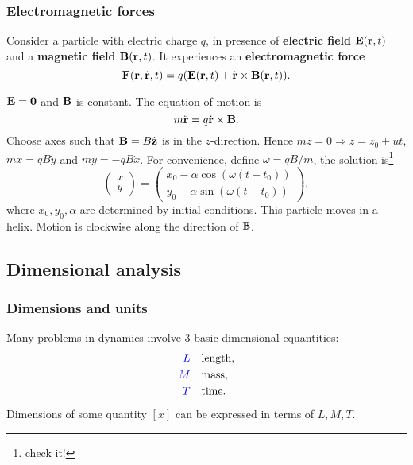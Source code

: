 \subsubsection{Electromagnetic forces}
\begin{law}
    Consider a particle with electric charge $q$, in presence of \textbf{electric field} $ {\bf E}({\bf r},t) $ and a \textbf{magnetic field} $ {\bf B}({\bf r},t) $. It experiences an \textbf{electromagnetic force}
    \[
        {\bf F}({\bf r},\dot{{\bf r}},t) = q({\bf E}({\bf r},t)+\dot{{\bf r}}\times {\bf B}({\bf r},t)).
    \]
\end{law}
\begin{example}
    $ {\bf E} = \mathbf{0} $ and $ {\bf B} $ is constant. The equation of motion is 
    \[
        m \ddot{{\bf r}} = q \dot{{\bf r}} \times {\bf B}.
    \]
    Choose axes such that ${\bf B} = B \hat{{\bf z}}$ is in the $z$-direction. Hence $m\ddot{z}=0 \Rightarrow z=z_0+ut$, $ m \ddot{x}=qB \dot{y} $ and $ m \ddot{y}=-qB \dot{x} $. For convenience, define $ \omega = qB/m $, the solution is\footnote{check it!}
    \[
        \begin{pmatrix}
            x \\ y
        \end{pmatrix}=
        \begin{pmatrix}
            x_0-\alpha \cos (\omega(t-t_0)) \\ y_0+\alpha \sin (\omega(t-t_0))
        \end{pmatrix},
    \] 
    where $x_0,y_0,\alpha$ are determined by initial conditions. This particle moves in a helix. Motion is clockwise along the direction of $ {\mathbb{B}} $.
    \begin{center}
    \end{center}
\end{example}

\subsection{Dimensional analysis}
\subsubsection*{Dimensions and units}
Many problems in dynamics involve 3 basic dimensional equantities:
\begin{align*}
    {\color{blue}L} \quad &\text{length},\\ 
    {\color{blue}M} \quad &\text{mass},\\ 
    {\color{blue}T} \quad &\text{time}.
\end{align*}
Dimensions of some quantity $ [x] $ can be expressed in terms of $L,M,T$.

